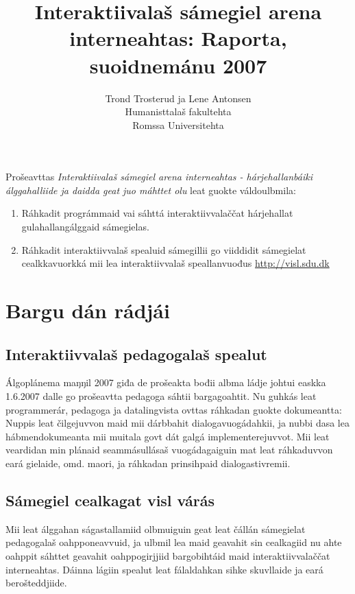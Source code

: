 \documentclass[a4paper,norsk]{article}
\begin{document}
\title{Interaktiivalaš sámegiel arena interneahtas: Raporta, suoidnemánu 2007}


\author{Trond Trosterud ja Lene Antonsen\\
Humanisttalaš fakultehta\\
Romssa Universitehta}

\maketitle


Prošeavttas \textit{Interaktiivalaš sámegiel arena interneahtas - hárjehallanbáiki álggahalliide ja daidda geat juo máhttet olu} leat guokte váldoulbmila:

\begin{enumerate}
\item Ráhkadit prográmmaid vai sáhttá interaktiivvalaččat hárjehallat gulahallangálggaid sámegielas.
\item Ráhkadit interaktiivvalaš spealuid sámegillii go viiddidit sámegielat cealkkavuorkká mii lea interaktiivvalaš speallanvuođus \url{http://visl.sdu.dk}
\end{enumerate}

\section{Bargu dán rádjái}

\subsection{Interaktiivvalaš pedagogalaš spealut}

Álgoplánema maŋŋil 2007 giđa de prošeakta bođii albma ládje  johtui easkka 1.6.2007 dalle go prošeavtta pedagoga sáhtii bargagoahtit. Nu guhkás leat programmerár, pedagoga ja datalingvista ovttas ráhkadan guokte dokumeantta: Nuppis leat čilgejuvvon maid mii dárbbahit dialogavuogádahkii, ja nubbi dasa lea hábmendokumeanta mii muitala govt dát galgá implementerejuvvot. Mii leat veardidan min plánaid seammásullásaš vuogádagaiguin mat leat ráhkaduvvon eará gielaide, omd. maori, ja ráhkadan prinsihpaid dialogastivremii.

\subsection{Sámegiel cealkagat visl várás}

Mii leat álggahan ságastallamiid olbmuiguin geat leat čállán sámegielat pedagogalaš oahpponeavvuid, ja ulbmil lea maid geavahit sin cealkagiid nu ahte oahppit sáhttet geavahit oahppogirjjiid bargobihtáid maid interaktiivvalaččat interneahtas. Dáinna lágiin spealut leat fálaldahkan sihke skuvllaide ja eará berošteddjiide.
\end{document}
